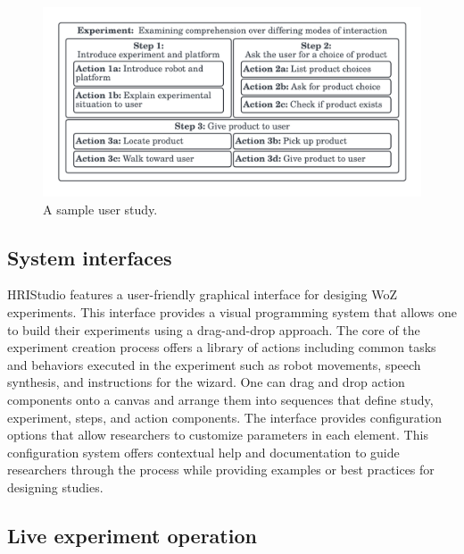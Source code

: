 \documentclass[letterpaper, 10 pt, conference]{ieeeconf}
\begin{document}

\begin{figure}[ht]
   \vskip -0.3cm
    \begin{center}
        \includegraphics[width=0.4\paperwidth]{assets/diagrams/experimentalarchitecture}
        \vskip -0.5cm
        \caption{A sample user study.}
        \label{experimentalarchitecture}
    \end{center}
\vskip -0.7cm
\end{figure}

\subsection{System interfaces} 

HRIStudio features a user-friendly graphical interface for desiging WoZ experiments. This interface provides a visual programming system that allows one to build their experiments using a drag-and-drop approach. The core of the experiment creation process offers a library of actions including common tasks and behaviors executed in the experiment such as robot movements, speech synthesis, and instructions for the wizard. One can drag and drop action components onto a canvas and arrange them into sequences that define  study, experiment, steps, and action components. The interface provides configuration options that allow researchers to customize parameters in each element. This configuration system offers contextual help and documentation to guide researchers through the process while providing examples or best practices for designing studies.

\subsection{Live experiment operation}
\end{document}
